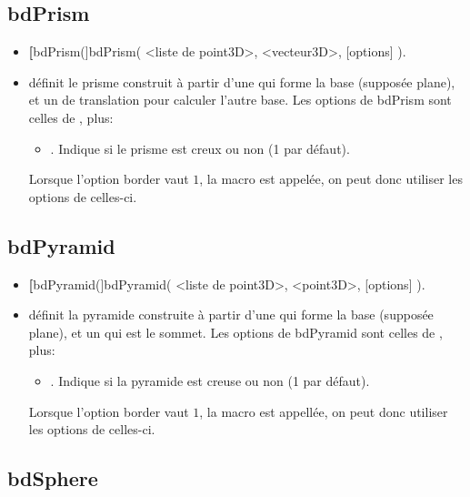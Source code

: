 \subsection{bdPrism}
\begin{itemize}
 \item \util \textbf[bdPrism(]{bdPrism( <liste de point3D>, <vecteur3D>, [options] )}.
 \item \desc définit le prisme construit à partir d'une  qui forme la base (supposée plane), et un  de translation pour calculer l'autre base. Les options de bdPrism sont celles de , plus:

  \begin{itemize}
   \item {}. Indique si le prisme est creux ou non (1 par défaut).
  \end{itemize}

Lorsque l'option \textcolor{\coloropt}{border} vaut $1$, la macro  est appelée, on peut donc utiliser les options de celles-ci.
\end{itemize}


\subsection{bdPyramid}
\begin{itemize}
 \item \util \textbf[bdPyramid(]{bdPyramid( <liste de point3D>, <point3D>, [options] )}.
 \item \desc définit la pyramide construite à partir d'une  qui forme la base (supposée plane), et un  qui est le sommet. Les options de bdPyramid sont celles de , plus:

  \begin{itemize}
   \item {}. Indique si la pyramide est creuse ou non (1 par défaut).
  \end{itemize}

Lorsque l'option \textcolor{\coloropt}{border} vaut $1$, la macro  est appellée, on peut donc utiliser les options de celles-ci.
\end{itemize}

\subsection{bdSphere}

